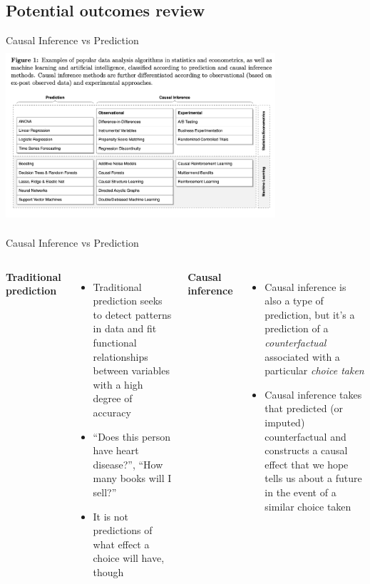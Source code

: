 \documentclass{beamer}
\begin{document}
\subsection{Potential outcomes review}

\begin{frame}{Causal Inference vs Prediction}
  \centering
  \includegraphics[scale=0.5,height=6.5cm, width=10cm]{./lecture_includes/prediction_causality.png}
\end{frame}

\begin{frame}{Causal Inference vs Prediction}

  \begin{columns}
    \centering
    \textbf{Traditional prediction}
    \begin{itemize}
      \item Traditional prediction seeks to detect patterns in data and fit functional relationships between variables with a high degree of accuracy
      \item ``Does this person have heart disease?'', ``How many books will I sell?''
      \item It is not predictions of what effect a choice will have, though
    \end{itemize}
    \centering
    \textbf{Causal inference}
    \begin{itemize}
      \item Causal inference is also a type of prediction, but it's a prediction of a \emph{counterfactual} associated with a particular \emph{choice taken}
      \item Causal inference takes that predicted (or imputed) counterfactual and constructs a causal effect that we hope tells us about a future in the event of a similar choice taken
    \end{itemize}
  \end{columns}
\end{frame}
\end{document}
